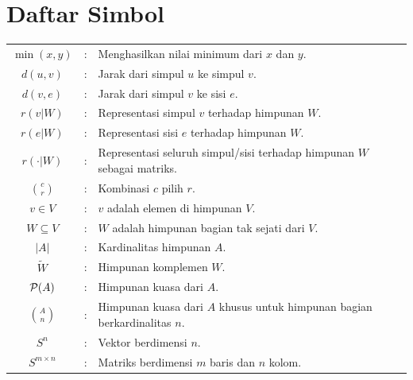 \chapter*{Daftar Simbol}

{
	\renewcommand{\arraystretch}{1.25}

	\noindent \begin{tabular}{@{}c@{\ }l@{\enspace}l}
		\(\min(x, y)\) &:& Menghasilkan nilai minimum dari \(x\) dan \(y\). \\

		\(d(u, v)\) &:& Jarak dari simpul \(u\) ke simpul \(v\). \\

		\(d(v, e)\) &:& Jarak dari simpul \(v\) ke sisi \(e\). \\

		\(r(v|W)\) &:& Representasi simpul \(v\) terhadap himpunan \(W\). \\

		\(r(e|W)\) &:& Representasi sisi \(e\) terhadap himpunan \(W\). \\

		\(r(\cdot|W)\) &:& Representasi seluruh simpul/sisi terhadap himpunan \(W\) sebagai matriks. \\ [.5em]

		\(\displaystyle \binom{c}{r}\) &:& Kombinasi \(c\) pilih \(r\). \\ [1em]

		\(v \in V\) &:& \(v\) adalah elemen di himpunan \(V\). \\

		\(W \subseteq V\) &:& \(W\) adalah himpunan bagian tak sejati dari \(V\). \\

		\(|A|\) &:& Kardinalitas himpunan \(A\). \\ [.25em]

		\(\widetilde{W}\) &:& Himpunan komplemen \(W\). \\

		\(\mathcal{P}(A)\) &:& Himpunan kuasa dari \(A\). \\ [.5em]

		\(\displaystyle \binom{A}{n}\) &:& Himpunan kuasa dari \(A\) khusus untuk himpunan bagian berkardinalitas \(n\). \\ [1em]

		\(S^n\) &:& Vektor berdimensi \(n\). \\

		\(S^{m\times n}\) &:& Matriks berdimensi \(m\) baris dan \(n\) kolom. \\


\end{tabular}}
